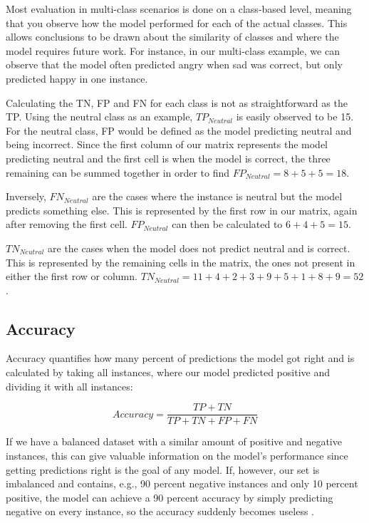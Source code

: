 \documentclass[nofilelist]{cslthse-msc}
\begin{document}
Most evaluation in multi-class scenarios is done on a class-based level, meaning that you observe how the model performed for each of the actual classes. This allows conclusions to be drawn about the similarity of classes and where the model requires future work. For instance, in our multi-class example, we can observe that the model often predicted angry when sad was correct, but only predicted happy in one instance.

Calculating the TN, FP and FN for each class is not as straightforward as the TP. Using the neutral class as an example, $TP_{Neutral}$ is easily observed to be 15. For the neutral class, FP would be defined as the model predicting neutral and being incorrect. Since the first column of our matrix represents the model predicting neutral and the first cell is when the model is correct, the three remaining can be summed together in order to find $FP_{Neutral} = 8+5+5=18$.

Inversely, $FN_{Neutral}$ are the cases where the instance is neutral but the model predicts something else. This is represented by the first row in our matrix, again after removing the first cell. $FP_{Neutral}$ can then be calculated to $6+4+5=15$.


$TN_{Neutral}$ are the cases when the model does not predict neutral and is correct. This is represented by the remaining cells in the matrix, the ones not present in either the first row or column. $TN_{Neutral} = 11+4+2+3+9+5+1+8+9 = 52 $.









\subsection{Accuracy}
Accuracy quantifies how many percent of predictions the model got right and is calculated by taking all instances, where our model predicted positive and dividing it with all instances:

$$ Accuracy = \frac{TP + TN}{TP + TN + FP + FN}$$

If we have a balanced dataset with a similar amount of positive and negative instances, this can give valuable information on the model's performance since getting predictions right is the goal of any model. If, however, our set is imbalanced and contains, e.g., 90 percent negative instances and only 10 percent positive, the model can achieve a 90 percent accuracy by simply predicting negative on every instance, so the accuracy suddenly becomes useless \citep{imbalancedlearning}. 
\end{document}
